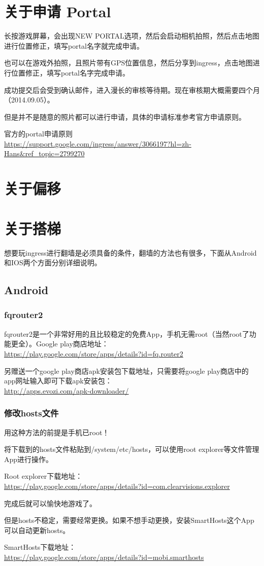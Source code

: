 \documentclass[a4paper]{article}
\begin{document}
\section{关于申请 Portal}
长按游戏屏幕，会出现NEW PORTAL选项，然后会启动相机拍照，然后点击地图进行位置修正，填写portal名字就完成申请。\par
也可以在游戏外拍照，且照片带有GPS位置信息，然后分享到ingress，点击地图进行位置修正，填写portal名字完成申请。\par
成功提交后会受到确认邮件，进入漫长的审核等待期。现在审核期大概需要四个月（2014.09.05）。\par
但是并不是随意的照片都可以进行申请，具体的申请标准参考官方申请原则。\par
官方的portal申请原则\\
\url{https://support.google.com/ingress/answer/3066197?hl=zh-Hans&ref_topic=2799270}

\section{关于偏移}

\section{关于搭梯}
想要玩ingress进行翻墙是必须具备的条件，翻墙的方法也有很多，下面从Android和IOS两个方面分别详细说明。

\subsection{Android}
\subsubsection{fqrouter2}
fqrouter2是一个非常好用的且比较稳定的免费App，手机无需root（当然root了功能更全）。Google play商店地址：\\
\url{https://play.google.com/store/apps/details?id=fq.router2} \par
另赠送一个google play商店apk安装包下载地址，只需要将google play商店中的app网址输入即可下载apk安装包：\\
\url{http://apps.evozi.com/apk-downloader/}
\subsubsection{修改hosts文件}
用这种方法的前提是手机已root！\par
将下载到的hosts文件粘贴到/system/etc/hosts，可以使用root explorer等文件管理App进行操作。\par
Root explorer下载地址：\\
\url{https://play.google.com/store/apps/details?id=com.clearvisions.explorer}\par
完成后就可以愉快地游戏了。\par
但是hosts不稳定，需要经常更换。如果不想手动更换，安装SmartHosts这个App可以自动更新hosts。\par
SmartHosts下载地址：\\
\url{https://play.google.com/store/apps/details?id=mobi.smarthosts}
\end{document}
